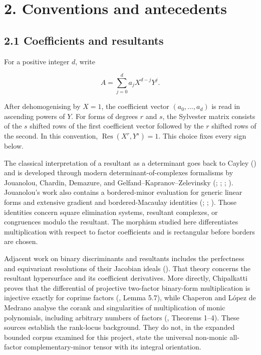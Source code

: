 \documentclass[
  11pt,
  a4paper,
]{article}
\begin{document}
\section{2. Conventions and
antecedents}\label{conventions-and-antecedents}

\subsection{2.1 Coefficients and
resultants}\label{coefficients-and-resultants}

For a positive integer \(d\), write

\[
 A=\sum_{j=0}^{d}a_jX^{d-j}Y^j.
\]

After dehomogenising by \(X=1\), the coefficient vector
\((a_0,\ldots,a_d)\) is read in ascending powers of \(Y\). For forms of
degrees \(r\) and \(s\), the Sylvester matrix consists of the \(s\)
shifted rows of the first coefficient vector followed by the \(r\)
shifted rows of the second. In this convention,
\(\operatorname{Res}(X^r,Y^s)=1\). This choice fixes every sign below.

The classical interpretation of a resultant as a determinant goes back
to Cayley () and is developed
through modern determinant-of-complexes formalisms by Jouanolou,
Chardin, Demazure, and Gelfand--Kapranov--Zelevinsky
(;
;
;
).
Jouanolou's work also contains a bordered-minor evaluation for generic
linear forms and extensive gradient and bordered-Macaulay identities
(;
; ).
Those identities concern square elimination systems, resultant
complexes, or congruences modulo the resultant. The morphism studied
here differentiates multiplication with respect to factor coefficients
and is rectangular before borders are chosen.

Adjacent work on binary discriminants and resultants includes the
perfectness and equivariant resolutions of their Jacobian ideals
().
That theory concerns the resultant hypersurface and its coefficient
derivatives. More directly, Chipalkatti proves that the differential of
projective two-factor binary-form multiplication is injective exactly
for coprime factors (,
Lemma 5.7), while Chaperon and López de Medrano analyse the corank and
singularities of multiplication of monic polynomials, including
arbitrary numbers of factors
(, Theorems 1--4). These sources establish the rank-locus
background. They do not, in the expanded bounded corpus examined for
this project, state the universal non-monic all-factor
complementary-minor tensor with its integral orientation.
\end{document}
